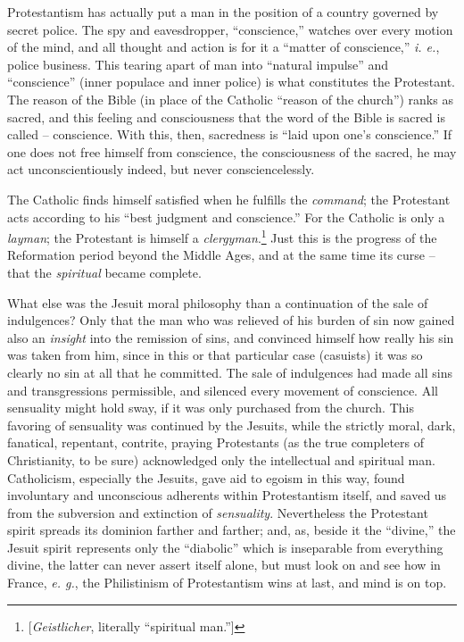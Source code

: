 \documentclass[12pt,a4paper]{book}
\begin{document}
Protestantism has actually put a man in the position of a country governed by 
secret police. The spy and eavesdropper, ``conscience,'' watches over every 
motion of the mind, and all thought and action is for it a ``matter of 
conscience,'' \textit{i. e.}, police business. This tearing apart of man into 
``natural impulse'' and ``conscience'' (inner populace and inner police) 
is what constitutes the Protestant. The reason of the Bible (in place of the 
Catholic ``reason of the church'') ranks as sacred, and this feeling and 
consciousness that the word of the Bible is sacred is called -- conscience. 
With this, then, sacredness is ``laid upon one's conscience.'' If one does 
not free himself from conscience, the consciousness of the sacred, he may act 
unconscientiously indeed, but never consciencelessly.

The Catholic finds himself satisfied when he fulfills the \textit{command}; 
the Protestant acts according to his ``best judgment and conscience.'' For 
the Catholic is only a \textit{layman}; the Protestant is himself a 
\textit{clergyman}.\footnote{[\textit{Geistlicher}, literally ``spiritual 
man.'']} Just this is the progress of the Reformation period beyond the 
Middle Ages, and at the same time its curse -- that the \textit{spiritual} 
became complete.

What else was the Jesuit moral philosophy than a continuation of the sale of 
indulgences? Only that the man who was relieved of his burden of sin now 
gained also an \textit{insight} into the remission of sins, and convinced 
himself how really his sin was taken from him, since in this or that 
particular case (casuists) it was so clearly no sin at all that he committed. 
The sale of indulgences had made all sins and transgressions permissible, and 
silenced every movement of conscience. All sensuality might hold sway, if it 
was only purchased from the church. This favoring of sensuality was continued 
by the Jesuits, while the strictly moral, dark, fanatical, repentant, 
contrite, praying Protestants (as the true completers of Christianity, to be 
sure) acknowledged only the intellectual and spiritual man. Catholicism, 
especially the Jesuits, gave aid to egoism in this way, found involuntary and 
unconscious adherents within Protestantism itself, and saved us from the 
subversion and extinction of \textit{sensuality}. Nevertheless the Protestant 
spirit spreads its dominion farther and farther; and, as, beside it the 
``divine,'' the Jesuit spirit represents only the ``diabolic'' which is 
inseparable from everything divine, the latter can never assert itself alone, 
but must look on and see how in France, \textit{e. g.}, the Philistinism of 
Protestantism wins at last, and mind is on top.
\end{document}
